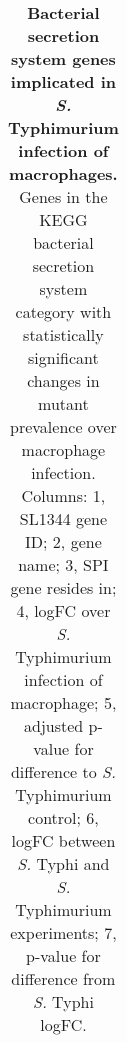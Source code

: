 %
\begin{table}
   \tiny
   \centering
   \noindent
    \caption[Bacterial secretion system genes implicated in {\it S.} Typhimurium infection of macrophages]{\textbf{Bacterial secretion system genes implicated in {\it S.} Typhimurium infection of macrophages.} Genes in the KEGG bacterial secretion system category with statistically significant changes in mutant prevalence over macrophage infection. Columns: 1, SL1344 gene ID; 2, gene name; 3, SPI gene resides in; 4, logFC over {\it S.} Typhimurium infection of macrophage; 5, adjusted p-value for difference to {\it S.} Typhimurium control; 6, logFC between {\it S.} Typhi and {\it S.} Typhimurium experiments; 7, p-value for difference from {\it S.} Typhi logFC. }
    \begin{tabular}{ l
    				l
				l
    				c
				c
				c
				c
				}
   

\end{tabular}
\end{table}
